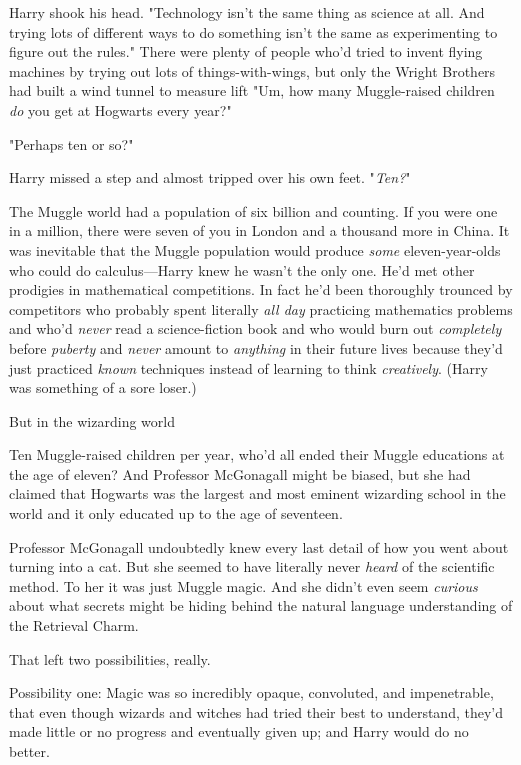 Harry shook his head. "Technology isn't the same thing as science at all. And
trying lots of different ways to do something isn't the same as experimenting
to figure out the rules." There were plenty of people who'd tried to invent
flying machines by trying out lots of things-with-wings, but only the Wright
Brothers had built a wind tunnel to measure lift{\el} "Um, how many
Muggle-raised children \emph{do} you get at Hogwarts every year?"

"Perhaps ten or so?"

Harry missed a step and almost tripped over his own feet. "\emph{Ten?}"

The Muggle world had a population of six billion and counting. If you were one
in a million, there were seven of you in London and a thousand more in China.
It was inevitable that the Muggle population would produce \emph{some}
eleven-year-olds who could do calculus—Harry knew he wasn't the only one.
He'd met other prodigies in mathematical competitions. In fact he'd been
thoroughly trounced by competitors who probably spent literally \emph{all day}
practicing mathematics problems and who'd \emph{never} read a science-fiction book
and who would burn out \emph{completely} before \emph{puberty} and \emph{never}
amount to \emph{anything} in their future lives because they'd just practiced
\emph{known} techniques instead of learning to think \emph{creatively}. (Harry
was something of a sore loser.)

But{\el} in the wizarding world{\el}

Ten Muggle-raised children per year, who'd all ended their Muggle educations at
the age of eleven? And Professor McGonagall might be biased, but she had
claimed that Hogwarts was the largest and most eminent wizarding school in the
world{\el} and it only educated up to the age of seventeen.

Professor McGonagall undoubtedly knew every last detail of how you went about
turning into a cat. But she seemed to have literally never \emph{heard} of the
scientific method. To her it was just Muggle magic. And she didn't even seem
\emph{curious} about what secrets might be hiding behind the natural language
understanding of the Retrieval Charm.

That left two possibilities, really.

Possibility one: Magic was so incredibly opaque, convoluted, and impenetrable,
that even though wizards and witches had tried their best to understand, they'd
made little or no progress and eventually given up; and Harry would do no
better.

